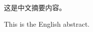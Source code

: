 \documentclass{sduthesis}
\begin{document}
\START
\begin{cnabstract}
这是中文摘要内容。
\end{cnabstract}

\begin{enabstract}
This is the English abstract.
\end{enabstract}
\END
\end{document}
